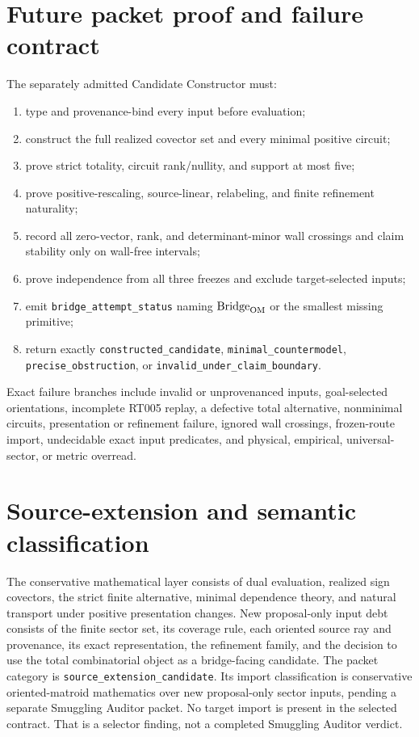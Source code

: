 \documentclass[11pt]{article}
\begin{document}
\section{Future packet proof and failure contract}

The separately admitted Candidate Constructor must:
\begin{enumerate}
  \item type and provenance-bind every input before evaluation;
  \item construct the full realized covector set and every minimal positive
        circuit;
  \item prove strict totality, circuit rank/nullity, and support at most five;
  \item prove positive-rescaling, source-linear, relabeling, and finite
        refinement naturality;
  \item record all zero-vector, rank, and determinant-minor wall crossings and
        claim stability only on wall-free intervals;
  \item prove independence from all three freezes and exclude target-selected
        inputs;
  \item emit \texttt{bridge\_attempt\_status} naming
        \(\operatorname{Bridge}_{\rm OM}\) or the smallest missing primitive;
  \item return exactly
        \texttt{constructed\_candidate},
        \texttt{minimal\_countermodel},
        \texttt{precise\_obstruction}, or
        \texttt{invalid\_under\_claim\_boundary}.
\end{enumerate}

Exact failure branches include invalid or unprovenanced inputs, goal-selected
orientations, incomplete RT005 replay, a defective total alternative,
nonminimal circuits, presentation or refinement failure, ignored wall
crossings, frozen-route import, undecidable exact input predicates, and
physical, empirical, universal-sector, or metric overread.

\section{Source-extension and semantic classification}

The conservative mathematical layer consists of dual evaluation, realized
sign covectors, the strict finite alternative, minimal dependence theory, and
natural transport under positive presentation changes.  New proposal-only
input debt consists of the finite sector set, its coverage rule, each oriented
source ray and provenance, its exact representation, the refinement family,
and the decision to use the total combinatorial object as a bridge-facing
candidate.  The packet category is
\texttt{source\_extension\_candidate}.  Its import classification is
conservative oriented-matroid mathematics over new proposal-only sector
inputs, pending a separate Smuggling Auditor packet.
No target import is present in the selected contract.  That is a selector
finding, not a completed Smuggling Auditor verdict.
\end{document}

